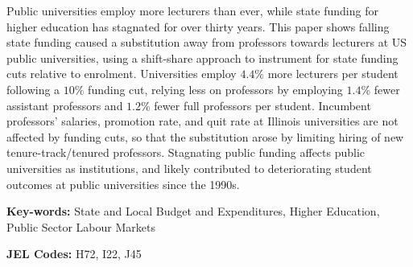 Public universities employ more lecturers than ever, while state funding for higher education has stagnated for over thirty years.
This paper shows falling state funding caused a substitution away from professors towards lecturers at US public universities, using a shift-share approach to instrument for state funding cuts relative to enrolment.
Universities employ $4.4$\% more lecturers per student following a $10$\% funding cut, relying less on professors by employing $1.4$\% fewer assistant professors and $1.2$\% fewer full professors per student.
Incumbent professors' salaries, promotion rate, and quit rate at Illinois universities are not affected by funding cuts, so that the substitution arose by limiting hiring of new tenure-track/tenured professors.
Stagnating public funding affects public universities as institutions, and likely contributed to deteriorating student outcomes at public universities since the 1990s.

\vfill
\noindent
\textbf{Key-words:}
State and Local Budget and Expenditures,
Higher Education,
Public Sector Labour Markets

\vspace{0.05cm}
\noindent
\textbf{JEL Codes:} H72, I22, J45
